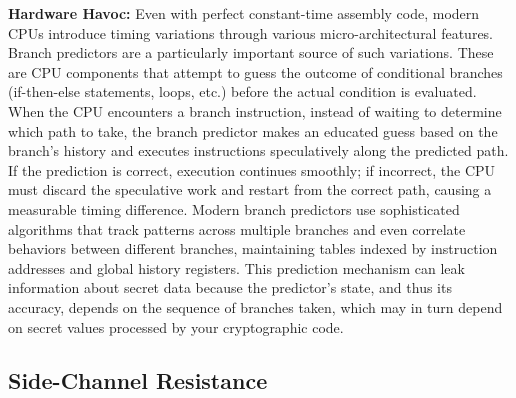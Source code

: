 \documentclass[10pt,a4paper,american]{exam}
\begin{document}
\begin{questions}
	\question[5] \textbf{Hardware Havoc:}
	Even with perfect constant-time assembly code, modern CPUs introduce timing variations through various micro-architectural features. Branch predictors are a particularly important source of such variations. These are CPU components that attempt to guess the outcome of conditional branches (if-then-else statements, loops, etc.) before the actual condition is evaluated. When the CPU encounters a branch instruction, instead of waiting to determine which path to take, the branch predictor makes an educated guess based on the branch's history and executes instructions speculatively along the predicted path. If the prediction is correct, execution continues smoothly; if incorrect, the CPU must discard the speculative work and restart from the correct path, causing a measurable timing difference. Modern branch predictors use sophisticated algorithms that track patterns across multiple branches and even correlate behaviors between different branches, maintaining tables indexed by instruction addresses and global history registers. This prediction mechanism can leak information about secret data because the predictor's state, and thus its accuracy, depends on the sequence of branches taken, which may in turn depend on secret values processed by your cryptographic code.

	\subsection*{Side-Channel Resistance}


\end{questions}
\end{document}
